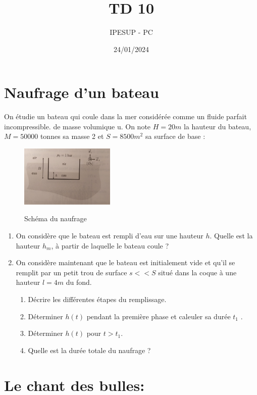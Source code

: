 \documentclass{article}
\title{TD 10}
\author{IPESUP - PC }
\date{24/01/2024}
\begin{document}
\maketitle



\section{Naufrage d'un bateau}

On étudie un bateau qui coule dans la mer considérée comme un fluide parfait incompressible.
de masse volumique u. On note $H = 20 m$ la hauteur du bateau, $M = 50000$ tonnes sa masse
2 et $S = 8500 m^2$ sa surface de base :

\begin{figure}[h]
  \centering
  \includegraphics[width=0.4\textwidth]{naufrage_bateau.jpg}
  \label{fig:maison}
    \caption{Schéma du naufrage}
\end{figure}


\begin{enumerate}
 \item  On considère que le bateau est rempli d’eau sur une hauteur $h$. Quelle est la hauteur $h_m$, à
partir de laquelle le bateau coule ?
\item On considère maintenant que le bateau est initialement vide et qu'il se remplit par un petit
trou de surface $s << S$ situé dans la coque à une hauteur $l=4m$ du fond.
\begin{enumerate}
  \item Décrire les différentes étapes du remplissage.
  \item Déterminer $ h(t) $ pendant la première phase et caleuler sa durée $t_1$ .
  \item Déterminer $h(t)$ pour $t > t_1$.
  \item Quelle est la durée totale du naufrage ?
\end{enumerate}

\end{enumerate}


\section{Le chant des bulles:}
\end{document}
